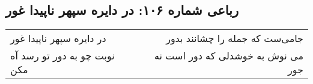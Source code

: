 \begin{center}
\section*{رباعی شماره ۱۰۶: در دایره سپهر ناپیدا غور}
\label{sec:sh106}
\begin{longtable}{l p{0.5cm} r}
در دایره سپهر ناپیدا غور
&&
جامی‌ست که جمله را چشانند بدور
\\
نوبت چو به دور تو رسد آه مکن
&&
می نوش به خوشدلی که دور است نه جور
\\
\end{longtable}
\end{center}
